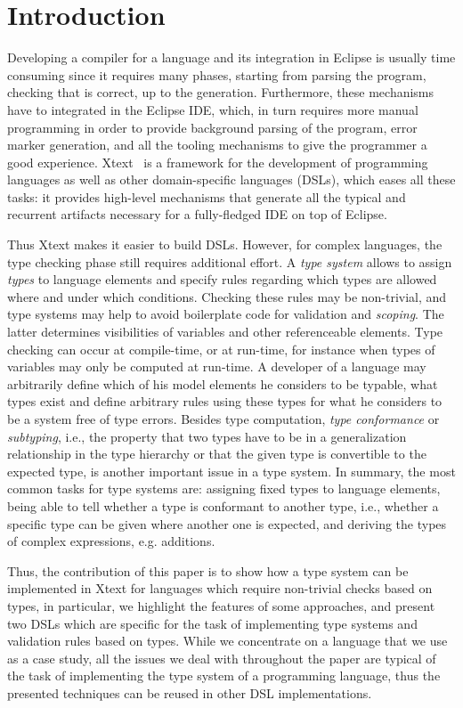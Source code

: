 \section{Introduction}
\label{sec:introduction}

Developing a compiler for a language and its integration in Eclipse is usually
time consuming since it requires many phases, starting from parsing the program,
checking that is correct, up to the generation.  Furthermore, these mechanisms
have to integrated in the Eclipse IDE, which, in turn requires more manual
programming in order to provide background parsing of the program, error marker
generation, and all the tooling mechanisms to give the programmer a good
experience.  Xtext~\cite{xtext} is a framework for the development of
programming languages as well as other domain-specific languages (DSLs), which eases all
these tasks: it provides high-level mechanisms that generate all the typical and
recurrent artifacts necessary for a fully-fledged IDE on top of Eclipse.

Thus Xtext makes it easier to build DSLs.  However, for complex languages, the
type checking phase still requires additional effort.
A \emph{type system} allows to assign \emph{types} to language elements and
specify rules regarding which types are allowed where and under which
conditions.
Checking these rules may be non-trivial, and type systems may help to avoid
boilerplate code for validation and \emph{scoping}. The latter determines
visibilities of variables and other referenceable elements.
Type checking can occur at compile-time, or at run-time, for instance when types
of variables may only be computed at run-time.   A developer of a language may
arbitrarily define which of his model elements he considers to be typable, what
types exist and define arbitrary rules using these types for what he considers
to be a system free of type errors.
Besides type computation, \emph{type conformance} or \emph{subtyping}, i.e., the
property that two types have to be in a generalization relationship in the type
hierarchy or that the given type is convertible to the expected type, is another
important issue in a type system.
In summary, the most common tasks for type systems are:
assigning fixed types to language elements, being able to tell whether a type is
conformant to another type, i.e., whether a specific type can be given where
another one is expected, and deriving the types of complex expressions, e.g.
additions.

Thus, the contribution of this paper is to show how a type system can be
implemented in Xtext for languages which require non-trivial checks based on
types, in particular, we highlight the features of some approaches, and present
two DSLs which are specific for the task of implementing type systems and
validation rules based on types.  While we concentrate on a language that we use
as a case study, all the issues we deal with throughout the paper are typical of
the task of implementing the type system of a programming language, thus the
presented techniques can be reused in other DSL implementations.

